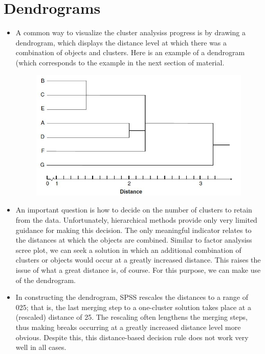 \documentclass[a4paper,12pt]{article}
\begin{document}
\section{Dendrograms}
\begin{itemize}
	
	\item A common way to visualize the cluster analysiss progress is by drawing a
	dendrogram, which displays the distance level at which there was a combination
	of objects and clusters.
	Here is an example of a dendrogram (which corresponds to the example in the next section of material.
	
	
	\begin{figure}[h!]
		\begin{center}

			\includegraphics[scale=0.6]{images/Dendrogram.jpg}\\
		\end{center}
	\end{figure}
	
	\item An important question is how to decide on the number of
	clusters to retain from the data. Unfortunately, hierarchical methods provide only
	very limited guidance for making this decision. The only meaningful indicator
	relates to the distances at which the objects are combined. Similar to factor
	analysiss scree plot, we can seek a solution in which an additional combination
	of clusters or objects would occur at a greatly increased distance. This raises the
	issue of what a great distance is, of course. For this purpose, we can make use of the dendrogram.
	
	\item In constructing the dendrogram, SPSS rescales the distances to a range of 025; that is, the last merging step to a one-cluster solution takes place at a
	(rescaled) distance of 25. The rescaling often lengthens the merging steps, thus
	making breaks occurring at a greatly increased distance level more obvious. Despite this, this distance-based decision rule does not work very well in all
	cases.
	

\end{itemize}
\end{document}

